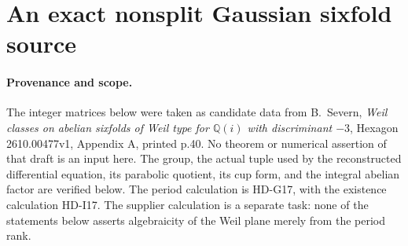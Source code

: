 \section{An exact nonsplit Gaussian sixfold source}
\label{sec:e8-exact-source}

\paragraph{Provenance and scope.}
The integer matrices below were taken as candidate data from
B.\ Severn, \emph{Weil classes on abelian sixfolds of Weil type for
\(\mathbb Q(i)\) with discriminant \(-3\)}, Hexagon 2610.00477v1,
Appendix A, printed p.40. No theorem or numerical assertion of that
draft is an input here. The group, the actual tuple used by the
reconstructed differential equation, its parabolic quotient, its cup
form, and the integral abelian factor are verified below. The period
calculation is HD-G17, with the existence calculation HD-I17.
The supplier calculation is a separate task: none of the statements
below asserts algebraicity of the Weil plane merely from the period rank.

